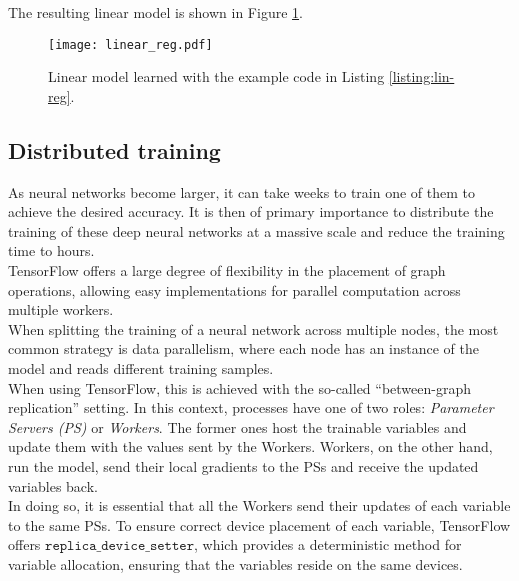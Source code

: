 The resulting linear model is shown in Figure \ref{fig:lin_reg-plot}.
\vfill
\begin{figure}[t]
  \centering
  \texttt{[image: linear\_reg.pdf]}
  \vspace{-0.5cm}
  \caption{Linear model learned with the example code in Listing \ref{listing:lin-reg}.}
  \label{fig:lin_reg-plot}
\end{figure}



\subsection{Distributed training} \label{sec:tf-dist-th}

As neural networks become larger, it can take weeks to train one of them to achieve the desired accuracy.
It is then of primary importance to distribute the training of these deep neural networks at a massive scale and reduce the training time to hours.\\
TensorFlow offers a large degree of flexibility in the placement of graph operations, allowing easy implementations for parallel computation across multiple workers.\\[-0.2cm]

When splitting the training of a neural network across multiple nodes, the most common strategy is data parallelism, where each node has an instance of the model and reads different training samples.\\
When using TensorFlow, this is achieved with the so-called ``between-graph replication'' setting.
In this context, processes have one of two roles: \textit{Parameter Servers (PS)} or \textit{Workers}.
The former ones host the trainable variables and update them with the values sent by the Workers.
Workers, on the other hand, run the model, send their local gradients to the PSs and receive the updated variables back.\\[-0.2cm]

In doing so, it is essential that all the Workers send their updates of each variable to the same PSs.
To ensure correct device placement of each variable, TensorFlow offers $\texttt{replica\_device\_setter}$, which provides a deterministic method for variable allocation, ensuring that the variables reside on the same devices.\\

